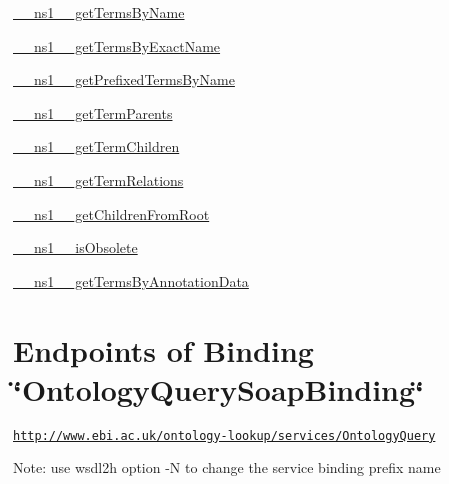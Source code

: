 \begin{DoxyItemize}
\item \hyperlink{struct____ns1____getTermsByName}{\_\-\_\-ns1\_\-\_\-getTermsByName}
\end{DoxyItemize}


\begin{DoxyItemize}
\item \hyperlink{struct____ns1____getTermsByExactName}{\_\-\_\-ns1\_\-\_\-getTermsByExactName}
\end{DoxyItemize}


\begin{DoxyItemize}
\item \hyperlink{struct____ns1____getPrefixedTermsByName}{\_\-\_\-ns1\_\-\_\-getPrefixedTermsByName}
\end{DoxyItemize}


\begin{DoxyItemize}
\item \hyperlink{struct____ns1____getTermParents}{\_\-\_\-ns1\_\-\_\-getTermParents}
\end{DoxyItemize}


\begin{DoxyItemize}
\item \hyperlink{struct____ns1____getTermChildren}{\_\-\_\-ns1\_\-\_\-getTermChildren}
\end{DoxyItemize}


\begin{DoxyItemize}
\item \hyperlink{struct____ns1____getTermRelations}{\_\-\_\-ns1\_\-\_\-getTermRelations}
\end{DoxyItemize}


\begin{DoxyItemize}
\item \hyperlink{struct____ns1____getChildrenFromRoot}{\_\-\_\-ns1\_\-\_\-getChildrenFromRoot}
\end{DoxyItemize}


\begin{DoxyItemize}
\item \hyperlink{struct____ns1____isObsolete}{\_\-\_\-ns1\_\-\_\-isObsolete}
\end{DoxyItemize}


\begin{DoxyItemize}
\item \hyperlink{struct____ns1____getTermsByAnnotationData}{\_\-\_\-ns1\_\-\_\-getTermsByAnnotationData}
\end{DoxyItemize}\hypertarget{OntologyQuerySoapBinding_OntologyQuerySoapBinding_ports}{}\section{Endpoints of Binding  \char`\"{}OntologyQuerySoapBinding\char`\"{}}\label{OntologyQuerySoapBinding_OntologyQuerySoapBinding_ports}

\begin{DoxyItemize}
\item \href{http://www.ebi.ac.uk/ontology-lookup/services/OntologyQuery}{\tt http://www.ebi.ac.uk/ontology-\/lookup/services/OntologyQuery}
\end{DoxyItemize}

Note: use wsdl2h option -\/N to change the service binding prefix name 